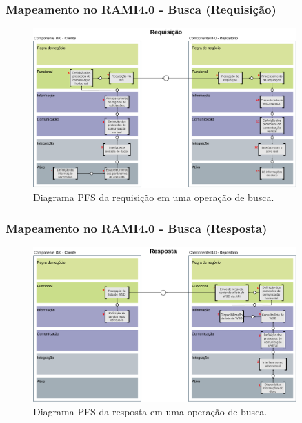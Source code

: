 \documentclass[10pt]{beamer}
\begin{document}
\begin{frame}
	\frametitle{Mapeamento no RAMI4.0 - Busca (Requisição)}
	
	\begin{figure}[htb]
		\centering
		\caption{Diagrama PFS da requisição em uma operação de busca.}
		\label{fig:rami-busca-requisicao}
		\includegraphics[width=0.9\textwidth]{rami-busca-requisicao}

	\end{figure}
	
\end{frame}
\begin{frame}
	\frametitle{Mapeamento no RAMI4.0 - Busca (Resposta)}
	
	\begin{figure}[htb]
		\centering
		\caption{Diagrama PFS da resposta em uma operação de busca.}
		\label{fig:rami-busca-resposta}
		\includegraphics[width=0.9\textwidth]{rami-busca-resposta}

	\end{figure}

\end{frame}
\end{document}
